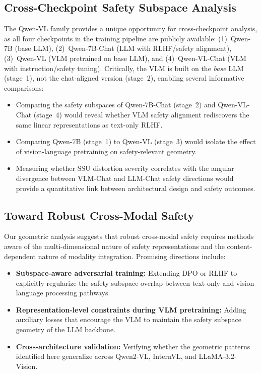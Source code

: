 \documentclass{article}
\begin{document}
\subsection{Cross-Checkpoint Safety Subspace Analysis}

The Qwen-VL family provides a unique opportunity for cross-checkpoint analysis,
as all four checkpoints in the training pipeline are publicly available: (1)~Qwen-7B
(base LLM), (2)~Qwen-7B-Chat (LLM with RLHF/safety alignment), (3)~Qwen-VL
(VLM pretrained on base LLM), and (4)~Qwen-VL-Chat (VLM with instruction/safety
tuning).  Critically, the VLM is built on the \emph{base} LLM (stage~1), not the
chat-aligned version (stage~2), enabling several informative comparisons:

\begin{itemize}
  \item Comparing the safety subspaces of Qwen-7B-Chat (stage~2) and
        Qwen-VL-Chat (stage~4) would reveal whether VLM safety alignment
        rediscovers the same linear representations as text-only RLHF.
  \item Comparing Qwen-7B (stage~1) to Qwen-VL (stage~3) would isolate the
        effect of vision-language pretraining on safety-relevant geometry.
  \item Measuring whether SSU distortion severity correlates with the angular
        divergence between VLM-Chat and LLM-Chat safety directions would provide
        a quantitative link between architectural design and safety outcomes.
\end{itemize}

\subsection{Toward Robust Cross-Modal Safety}
\label{sec:future_robust}

Our geometric analysis suggests that robust cross-modal safety requires methods
aware of the multi-dimensional nature of safety representations and the
content-dependent nature of modality integration.  Promising directions include:

\begin{itemize}
  \item \textbf{Subspace-aware adversarial training:} Extending DPO or RLHF to
        explicitly regularize the safety subspace overlap between text-only and
        vision-language processing pathways.
  \item \textbf{Representation-level constraints during VLM pretraining:} Adding
        auxiliary losses that encourage the VLM to maintain the safety subspace
        geometry of the LLM backbone.
  \item \textbf{Cross-architecture validation:} Verifying whether the geometric
        patterns identified here generalize across Qwen2-VL, InternVL, and
        LLaMA-3.2-Vision.
\end{itemize}
\end{document}
